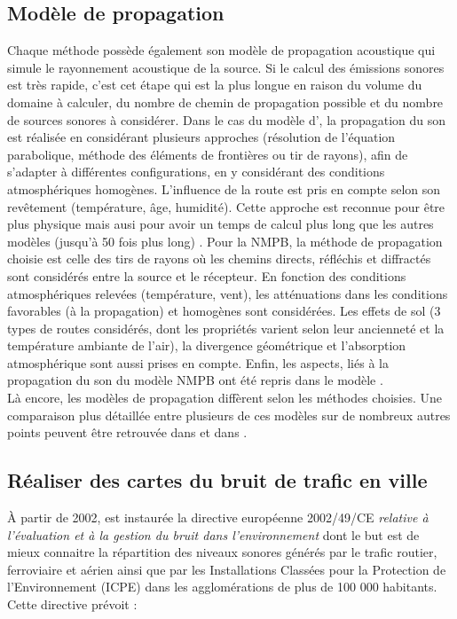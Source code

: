 \subsection{Modèle de propagation}\label{part:modele_propa}
Chaque méthode possède également son modèle de propagation acoustique qui simule le rayonnement acoustique de la source. Si le calcul des émissions sonores est très rapide, c'est cet étape qui est la plus longue en raison du volume du domaine à calculer, du nombre de chemin de propagation possible et du nombre de sources sonores à considérer.
Dans le cas du modèle d', la propagation du son est réalisée en considérant plusieurs approches (résolution de l'équation parabolique, méthode des éléments de frontières ou tir de rayons), afin de s'adapter à différentes configurations, en y considérant des conditions atmosphériques homogènes. L'influence de la route est pris en compte selon son revêtement (température, âge, humidité). Cette approche est reconnue pour être plus \og physique \fg{} mais ausi pour avoir un temps de calcul plus long que les autres modèles (jusqu'à 50 fois plus long) \cite{probst2011comparison}. Pour la NMPB, la méthode de propagation choisie est celle des tirs de rayons où les chemins directs, réfléchis et diffractés sont considérés entre la source et le récepteur. En fonction des conditions atmosphériques relevées (température, vent), les atténuations dans les conditions favorables (à la propagation) et homogènes sont considérées. Les effets de sol (3 types de routes considérés, dont les propriétés varient selon leur ancienneté et la température ambiante de l'air), la divergence géométrique et l'absorption atmosphérique sont aussi prises en compte.
Enfin, les aspects, liés à la propagation du son du modèle NMPB ont été repris dans le modèle . \\
Là encore, les modèles de propagation diffèrent selon les méthodes choisies. Une comparaison plus détaillée entre plusieurs de ces modèles sur de nombreux autres points peuvent être retrouvée dans \cite{steele_critical_2001} et dans \cite{garg_critical_2014}.

\subsection{Réaliser des cartes du bruit de trafic en ville}

À partir de 2002, est instaurée la directive européenne 2002/49/CE \textit{relative à l'évaluation et à la gestion du bruit dans l'environnement} \cite{directive} dont le but est de mieux connaitre la répartition des niveaux sonores générés par le trafic routier, ferroviaire et aérien ainsi que par les Installations Classées pour la Protection de l'Environnement (ICPE) dans les agglomérations de plus de 100 000 habitants. Cette directive prévoit :

